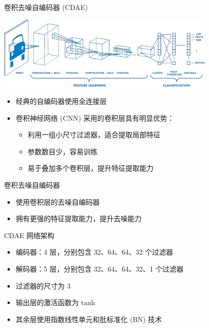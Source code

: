 \documentclass{beamer}
\begin{document}
\begin{frame}{卷积去噪自编码器 (CDAE)}
  \begin{center}
    \includegraphics[width=0.8\textwidth]{cnn}
  \end{center}
  \vspace{-1ex}
  \begin{itemize}
    \item 经典的自编码器使用\alert{全连接层}
    \item 卷积神经网络 (CNN) 采用的\alert{卷积层}具有明显优势：
      \begin{itemize}
        \item 利用一组小尺寸过滤器，适合提取局部特征
        \item 参数数目少，容易训练
        \item 易于叠加多个卷积层，提升特征提取能力
      \end{itemize}
  \end{itemize}
  \begin{alertblock}{卷积去噪自编码器}
    \vspace{-1ex}
    \begin{itemize}
      \item 使用卷积层的去噪自编码器
      \item 拥有更强的特征提取能力，提升去噪能力
    \end{itemize}
  \end{alertblock}
\end{frame}

\begin{frame}{CDAE 网络架构}
  \begin{itemize}
    \item 编码器：4 层，分别包含 32、64、64、32 个过滤器
    \item 解码器：5 层，分别包含 32、64、64、32、1 个过滤器
    \item 过滤器的尺寸为 3
    \item 输出层的激活函数为 \alert{tanh}
    \item 其余层使用\alert{指数线性单元}和\alert{批标准化} (BN) 技术
  \end{itemize}
\end{frame}
\end{document}
